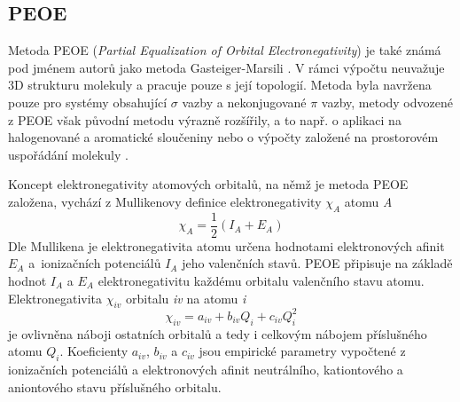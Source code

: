 \subsection{PEOE}
Metoda PEOE (\textit{Partial Equalization of Orbital Electronegativity}) je také známá pod jménem autorů jako metoda Gasteiger-Marsili \cite{GM}. V rámci výpočtu neuvažuje 3D strukturu molekuly a pracuje pouze s její topologií. Metoda byla navržena pouze pro systémy obsahující $\sigma$ vazby a nekonjugované $\pi$ vazby, metody odvozené z PEOE však původní metodu výrazně rozšířily, a to např. o aplikaci na halogenované a aromatické sloučeniny \cite{MPEOE_aromatic} nebo o výpočty založené na prostorovém uspořádání molekuly \cite{GDAC}.  

Koncept elektronegativity atomových orbitalů, na němž je metoda PEOE založena, vychází z Mullikenovy definice elektronegativity $\chi_A$ atomu \textit{A}
\begin{equation}
    \chi_A = \frac{1}{2}(I_A + E_A)
\end{equation}
Dle Mullikena je elektronegativita atomu určena hodnotami elektronových afinit $ E_A$ a~ionizačních potenciálů $I_A$ jeho valenčních stavů. PEOE připisuje na základě hodnot $I_A$ a $ E_A$ elektronegativitu každému orbitalu valenčního stavu atomu. Elektronegativita $\chi_{iv}$ orbitalu \textit{iv} na atomu \textit{i}
\begin{equation}
\label{PEOE_elneg}
    \chi_{iv} = a_{iv} + b_{iv}Q_i + c_{iv}Q_i^2
\end{equation}
je ovlivněna náboji ostatních orbitalů a tedy i celkovým nábojem příslušného atomu $Q_i$. Koeficienty $a_{iv}$, $b_{iv}$ a $c_{iv}$ jsou empirické parametry vypočtené z ionizačních potenciálů a elektronových afinit neutrálního, kationtového a aniontového stavu příslušného orbitalu.

